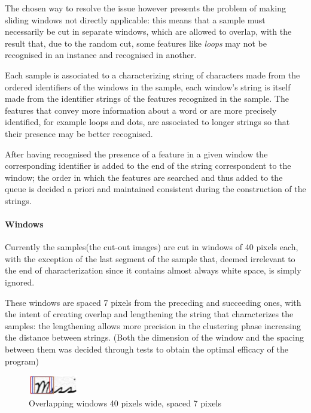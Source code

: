 The chosen way to resolve the issue however presents the problem of making sliding windows not directly applicable: this means that a sample must necessarily be cut in separate windows, which are allowed to overlap, with the result that, due to the random cut, some features like \textit{loops} may not be recognised in an instance and recognised in another. 

Each sample is associated to a characterizing string of characters made from the ordered identifiers of the windows in the sample, each window's string is itself made from the identifier strings of the features recognized in the sample.
The features that convey more information about a word or are more precisely identified, for example loops and dots, are associated to longer strings so that their presence may be better recognised.

After having recognised the presence of a feature in a given window the corresponding identifier is added to the end of the string correspondent to the window; the order in which the features are searched and thus added to the queue is decided a priori and maintained consistent during the construction of the strings. 


\paragraph{Windows}

Currently the samples(the cut-out images) are cut in windows of 40 pixels each, with the exception of the last segment of the sample that, deemed irrelevant to the end of characterization since it contains almost always white space, is simply ignored.

These windows are spaced 7 pixels from the preceding and succeeding ones, with the intent of creating overlap and lengthening the string that characterizes the samples: the lengthening allows more precision in the clustering phase increasing the distance between strings.
(Both the dimension of the window and the spacing between them was decided through tests to obtain the optimal efficacy of the program)

\begin{figure}[!htpb]
\centering
\includegraphics[width=0.19\textwidth]{images/sliding.jpg}
\caption{Overlapping windows 40 pixels wide, spaced 7 pixels}
\end{figure} 



